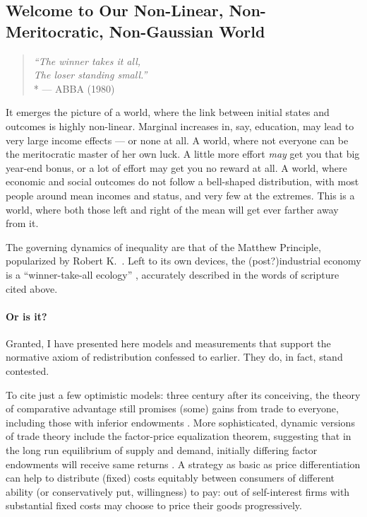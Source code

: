 \subsection[Our Non-Linear/Meritocratic/Gaussian World]{Welcome to Our Non-Linear, Non-Meritocratic, Non-Gaussian World}
\begin{verse}
	\emph{``The winner takes it all,\\
	The loser standing small.''}
	\\*
	--- ABBA (1980)
\end{verse}
It emerges the picture of a world, where the link between initial states and outcomes is highly non-linear.
Marginal increases in, say, education, may lead to very large income effects --- or none at all.
A world, where not everyone can be the meritocratic master of her own luck.
A little more effort \emph{may} get you that big year-end bonus, or a lot of effort may get you no reward at all.
A world, where economic and social outcomes do not follow a bell-shaped distribution, with most people around mean incomes and status, and very few at the extremes.
This is a world, where both those left and right of the mean will get ever farther away from it.

The governing dynamics of inequality are that of the Matthew Principle, popularized by Robert K.~\cite{Merton1988, Jackson1968}.
Left to its own devices, the (post?)industrial economy is a ``winner-take-all ecology'' \citep{Taleb2007}, accurately described in the words of scripture cited above.

\paragraph{Or is it?} Granted, I have presented here models and measurements that support the normative axiom of redistribution confessed to earlier.
They do, in fact, stand contested.

To cite just a few optimistic models:
three century after its conceiving, the theory of comparative advantage still promises (some) gains from trade to everyone, including those with inferior endowments \citep{Ricardo1817}.
More sophisticated, dynamic versions of trade theory include the factor-price equalization theorem, suggesting that in the long run equilibrium of supply and demand, initially differing factor endowments will receive same returns \citep{Stolper1941}.
A strategy as basic as price differentiation can help to distribute (fixed) costs equitably between consumers of different ability (or conservatively put, willingness) to pay:
out of self-interest firms with substantial fixed costs may choose to price their goods progressively.

